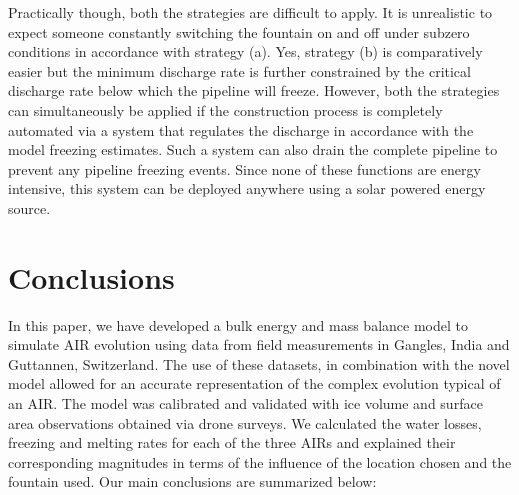 \documentclass[utf8]{frontiersSCNS}
\begin{document}
Practically though, both the strategies are difficult to apply. It is unrealistic to expect someone constantly
switching the fountain on and off under subzero conditions in accordance with strategy (a). Yes, strategy (b) is
comparatively easier but the minimum discharge rate is further constrained by the critical discharge rate below
which the pipeline will freeze. However, both the strategies can simultaneously be applied if the construction
process is completely automated via a system that regulates the discharge in accordance with the model freezing
estimates. Such a system can also drain the complete pipeline to prevent any pipeline freezing events. Since
none of these functions are energy intensive, this system can be deployed anywhere using a solar powered energy
source.

\section{Conclusions}

In this paper, we have developed a bulk energy and mass balance model to simulate AIR evolution using data from
field measurements in Gangles, India and Guttannen, Switzerland. The use of these datasets, in combination with
the novel model allowed for an accurate representation of the complex evolution typical of an AIR. The model was
calibrated and validated with ice volume and surface area observations obtained via drone surveys. We calculated
the water losses, freezing and melting rates for each of the three AIRs and explained their corresponding
magnitudes in terms of the influence of the location chosen and the fountain used. Our main conclusions are
summarized below:
\end{document}
